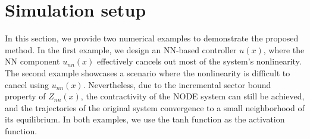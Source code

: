 \documentclass[journal,twoside,web]{ieeecolor}
\newtheorem{remark}	      [theorem]{Remark}
\begin{document}
\section{Simulation setup}\label{secss}
In this section, we provide two numerical examples to demonstrate the proposed method. In the first example, we design an NN-based controller $u(x)$, where the NN component $u_{nn}(x)$ effectively cancels out most of the system's nonlinearity. The second example showcases a scenario where the nonlinearity is difficult to cancel using $u_{nn}(x)$. Nevertheless, due to the incremental sector bound property of $Z_{nn}(x)$, the contractivity of the NODE system can still be achieved, and the trajectories of the original system convergence to a small neighborhood of its equilibrium. In both examples, we use the tanh function as the activation function.
\end{document}
